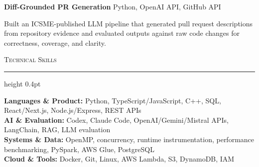 \documentclass[letterpaper,11pt]{article}
\newcommand{\resumesection}[1]{%
  \par\vspace{2pt}%
  {\large\scshape #1}\par\vspace{2pt}%
  \hrule height 0.4pt\vspace{2pt}%
}
\newcommand{\projectHeading}[2]{
  \textbf{#1} \hfill #2
}
\begin{document}
\projectHeading{Diff-Grounded PR Generation}{Python, OpenAI API, GitHub API}
\begin{tightitemize}
  \item Built an ICSME-published LLM pipeline that generated pull request descriptions from repository evidence and evaluated outputs against raw code changes for correctness, coverage, and clarity.
\end{tightitemize}

\resumesection{Technical Skills}
\textbf{Languages \& Product:} Python, TypeScript/JavaScript, C++, SQL, React/Next.js, Node.js/Express, REST APIs\\
\textbf{AI \& Evaluation:} Codex, Claude Code, OpenAI/Gemini/Mistral APIs, LangChain, RAG, LLM evaluation\\
\textbf{Systems \& Data:} OpenMP, concurrency, runtime instrumentation, performance benchmarking, PySpark, AWS Glue, PostgreSQL\\
\textbf{Cloud \& Tools:} Docker, Git, Linux, AWS Lambda, S3, DynamoDB, IAM
\end{document}

